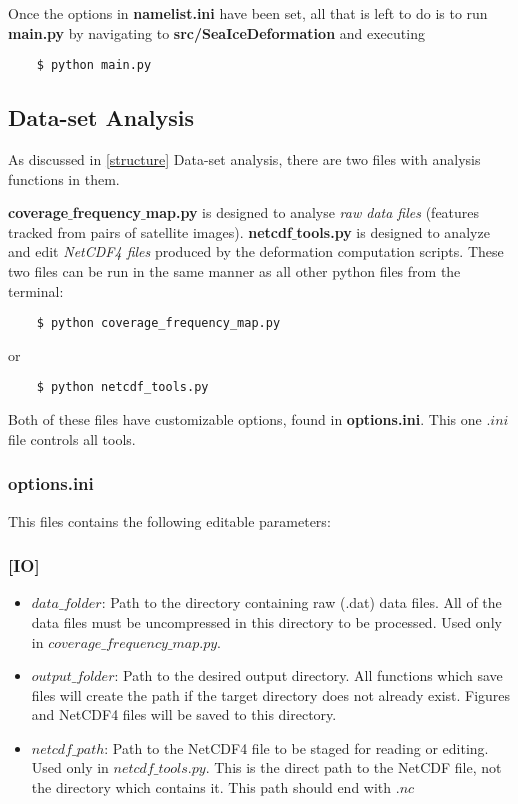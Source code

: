 \documentclass[12pt]{article}
\begin{document}
Once the options in \textbf{namelist.ini} have been set, all that is left to do is to run \textbf{main.py} by navigating to \textbf{src/SeaIceDeformation} and executing

\begin{verbatim}
    $ python main.py
\end{verbatim}

\subsection{Data-set Analysis}

As discussed in \ref{structure} Data-set analysis, there are two files with analysis functions in them. 

\textbf{coverage$\_$frequency$\_$map.py} is designed to analyse \textit{raw data files} (features tracked from pairs of satellite images). \textbf{netcdf$\_$tools.py} is designed to analyze and edit \textit{NetCDF4 files} produced by the deformation computation scripts. These two files can be run in the same manner as all other python files from the terminal:

\begin{verbatim}
    $ python coverage_frequency_map.py
\end{verbatim}

or 

\begin{verbatim}
    $ python netcdf_tools.py
\end{verbatim}

Both of these files have customizable options, found in \textbf{options.ini}. This one $.ini$ file controls all tools.

\subsubsection*{\textbf{options.ini}}
This files contains the following editable parameters:

\subsubsection*{[IO]}

\begin{itemize}
    \item $data\_folder$: Path to the directory containing raw (.dat) data files. All of the data files must be uncompressed in this directory to be processed. Used only in $coverage\_frequency\_map.py$.
    
    \item $output\_folder$: Path to the desired output directory. All functions which save files will create the path if the target directory does not already exist. Figures and NetCDF4 files will be saved to this directory.
    
    \item $netcdf\_path$: Path to the NetCDF4 file to be staged for reading or editing. Used only in $netcdf\_tools.py$. This is the direct path to the NetCDF file, not the directory which contains it. This path should end with $.nc$
\end{itemize}
\end{document}
